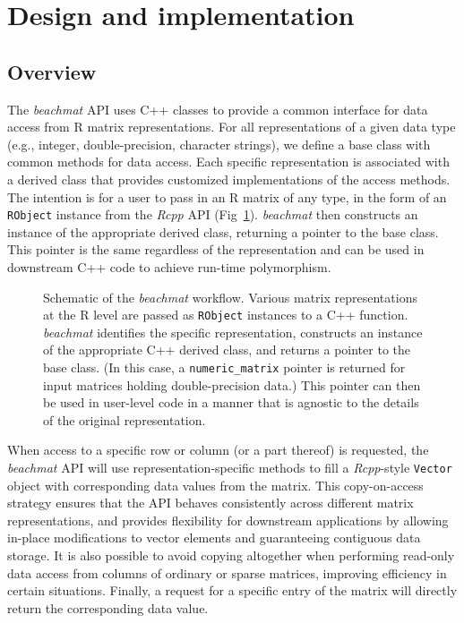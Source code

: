 \documentclass[10pt,letterpaper]{article}
\newcommand{\beachmat}{\textit{beachmat}}
\newcommand{\code}[1]{\texttt{#1}}
\begin{document}
\section*{Design and implementation}

\subsection*{Overview}
The \beachmat{} API uses C++ classes to provide a common interface for data access from R matrix representations.
For all representations of a given data type (e.g., integer, double-precision, character strings), we define a base class with common methods for data access.
Each specific representation is associated with a derived class that provides customized implementations of the access methods.
The intention is for a user to pass in an R matrix of any type, in the form of an \code{RObject} instance from the \textit{Rcpp} API (Fig~\ref{fig:beachoverview}).
\beachmat{} then constructs an instance of the appropriate derived class, returning a pointer to the base class.
This pointer is the same regardless of the representation and can be used in downstream C++ code to achieve run-time polymorphism.

\begin{figure}[b]
    \caption{Schematic of the \beachmat{} workflow.
        Various matrix representations at the R level are passed as \code{RObject} instances to a C++ function.
        \beachmat{} identifies the specific representation, constructs an instance of the appropriate C++ derived class, and returns a pointer to the base class.
        (In this case, a \code{numeric\_matrix} pointer is returned for input matrices holding double-precision data.)
        This pointer can then be used in user-level code in a manner that is agnostic to the details of the original representation.
    }
    \label{fig:beachoverview}
\end{figure}

When access to a specific row or column (or a part thereof) is requested, the \beachmat{} API will use representation-specific methods to fill a \textit{Rcpp}-style \code{Vector} object with corresponding data values from the matrix.
This copy-on-access strategy ensures that the API behaves consistently across different matrix representations, and provides flexibility for downstream applications by allowing in-place modifications to vector elements and guaranteeing contiguous data storage. 
It is also possible to avoid copying altogether when performing read-only data access from columns of ordinary or sparse matrices, improving efficiency in certain situations.
Finally, a request for a specific entry of the matrix will directly return the corresponding data value.
\end{document}
